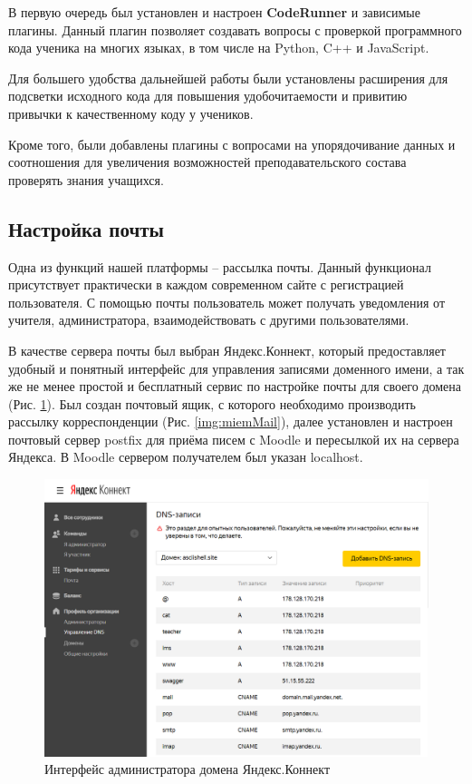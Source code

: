 \documentclass[a4paper,14pt]{article}
\begin{document}
В первую очередь был установлен и настроен \textbf{CodeRunner} и зависимые плагины.
Данный плагин позволяет создавать вопросы с проверкой программного кода ученика на многих языках, в том числе на Python, C++ и JavaScript.

Для большего удобства дальнейшей работы были установлены расширения для подсветки исходного кода для повышения удобочитаемости и привитию привычки к качественному коду у учеников.

Кроме того, были добавлены плагины с вопросами на упорядочивание данных и соотношения для увеличения возможностей преподавательского состава проверять знания учащихся.

\subsection{Настройка почты}

Одна из функций нашей платформы -- рассылка почты.
Данный функционал присутствует практически в каждом современном сайте с регистрацией пользователя.
С помощью почты пользователь может получать уведомления от учителя, администратора, взаимодействовать с другими пользователями.

В качестве сервера почты был выбран Яндекс.Коннект, который предоставляет удобный и понятный интерфейс для управления записями доменного имени, а так же не менее простой и бесплатный сервис по настройке почты для своего домена (Рис. \ref{img:yandex}).
Был создан почтовый ящик, с которого необходимо производить рассылку корреспонденции (Рис. \ref{img:miemMail}), далее установлен и настроен почтовый сервер postfix для приёма писем с Moodle и пересылкой их на сервера Яндекса.
В Moodle сервером получателем был указан localhost.

\begin{figure}[H]
	\centering
	\includegraphics[width=0.7\linewidth]{image/yandex_connect}
	\caption{Интерфейс администратора домена Яндекс.Коннект}
	\label{img:yandex}
\end{figure}
\end{document}
